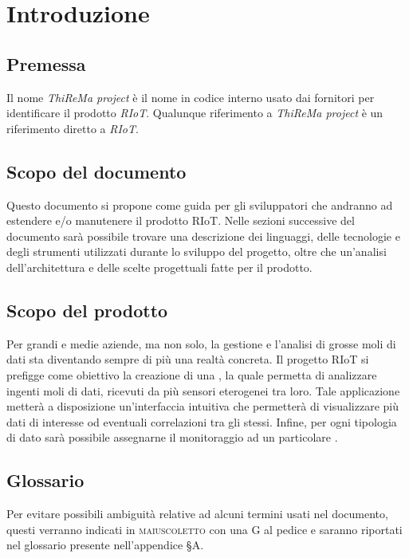 \section{Introduzione}
	\subsection{Premessa}
		Il nome \textit{ThiReMa project} è il nome in codice interno usato dai fornitori per identificare il prodotto \textit{RIoT}. Qualunque riferimento a \textit{ThiReMa project} è un riferimento diretto a \textit{RIoT}. 
	\subsection{Scopo del documento}
		Questo documento si propone come guida per gli sviluppatori che andranno ad estendere e/o manutenere il prodotto RIoT. 
		\newline
		Nelle sezioni successive del documento sarà possibile trovare una descrizione dei linguaggi, delle tecnologie e degli strumenti utilizzati durante lo sviluppo del progetto, oltre che un'analisi dell'architettura e delle scelte progettuali fatte per il prodotto.
	\subsection{Scopo del prodotto}
	 	Per grandi e medie aziende, ma non solo, la gestione e l'analisi di grosse moli di dati sta diventando sempre di più una realtà concreta.
	 	\newline
		Il progetto RIoT si prefigge come obiettivo la creazione di una , la quale permetta di analizzare ingenti moli di dati, ricevuti da più sensori eterogenei tra loro. Tale applicazione metterà a disposizione un'interfaccia intuitiva che permetterà di visualizzare più dati di interesse od eventuali correlazioni tra gli stessi. Infine, per ogni tipologia di dato sarà possibile assegnarne il monitoraggio ad un particolare .	
	\subsection{Glossario}
		Per evitare possibili ambiguità relative ad alcuni termini usati nel documento, questi verranno indicati in \textsc{maiuscoletto} con una G al pedice e saranno riportati nel glossario presente nell'appendice \S A.